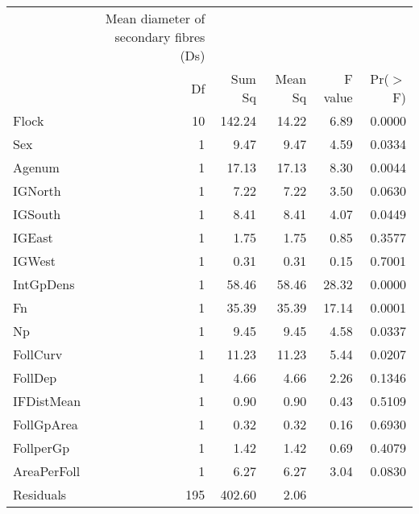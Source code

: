 \begin{table}[ht]
\begin{tabular}{lrrrrr}
\vspace{0.1in}
 & Mean diameter of secondary fibres (Ds) & & & & \\
 & Df & Sum Sq & Mean Sq & F value & Pr($>$F) \\ 
  \hline
Flock       & 10 & 142.24 & 14.22 & 6.89 & 0.0000 \\ 
  Sex         & 1 & 9.47 & 9.47 & 4.59 & 0.0334 \\ 
  Agenum      & 1 & 17.13 & 17.13 & 8.30 & 0.0044 \\ 
  IGNorth     & 1 & 7.22 & 7.22 & 3.50 & 0.0630 \\ 
  IGSouth     & 1 & 8.41 & 8.41 & 4.07 & 0.0449 \\ 
  IGEast      & 1 & 1.75 & 1.75 & 0.85 & 0.3577 \\ 
  IGWest      & 1 & 0.31 & 0.31 & 0.15 & 0.7001 \\ 
  IntGpDens   & 1 & 58.46 & 58.46 & 28.32 & 0.0000 \\ 
  Fn          & 1 & 35.39 & 35.39 & 17.14 & 0.0001 \\ 
  Np          & 1 & 9.45 & 9.45 & 4.58 & 0.0337 \\ 
  FollCurv    & 1 & 11.23 & 11.23 & 5.44 & 0.0207 \\ 
  FollDep     & 1 & 4.66 & 4.66 & 2.26 & 0.1346 \\ 
  IFDistMean  & 1 & 0.90 & 0.90 & 0.43 & 0.5109 \\ 
  FollGpArea  & 1 & 0.32 & 0.32 & 0.16 & 0.6930 \\ 
  FollperGp   & 1 & 1.42 & 1.42 & 0.69 & 0.4079 \\ 
  AreaPerFoll & 1 & 6.27 & 6.27 & 3.04 & 0.0830 \\ 
  Residuals   & 195 & 402.60 & 2.06 &  &  \\ 
   \hline
\end{tabular}
\end{table}
